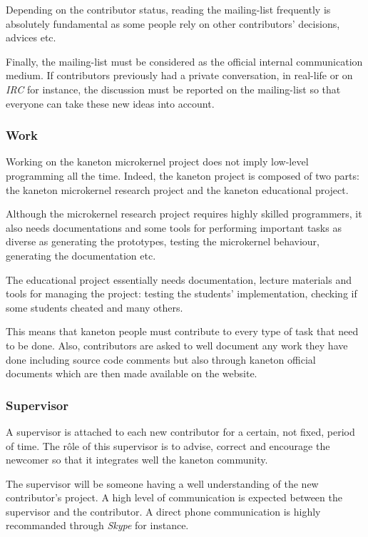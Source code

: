 Depending on the contributor status, reading the mailing-list frequently is
absolutely fundamental as some people rely on other contributors' decisions,
advices etc.

Finally, the mailing-list must be considered as the official internal
communication medium. If contributors previously had a private conversation,
in real-life or on \textit{IRC} for instance, the discussion must be reported
on the mailing-list so that everyone can take these new ideas into account.


\subsubsection{Work}

Working on the kaneton microkernel project does not imply low-level programming
all the time. Indeed, the kaneton project is composed of two parts: the
kaneton microkernel research project and the kaneton educational project.

Although the microkernel research project requires highly skilled programmers,
it also needs documentations and some tools for performing important tasks as
diverse as generating the prototypes, testing the microkernel behaviour,
generating the documentation etc.

The educational project essentially needs documentation, lecture materials
and tools for managing the project: testing the students' implementation,
checking if some students cheated and many others.

This means that kaneton people must contribute to every type of task
that need to be done. Also, contributors are asked to well document
any work they have done including source code comments but also through
kaneton official documents which are then made available on the website.


\subsubsection{Supervisor}

A supervisor is attached to each new contributor for a certain, not fixed,
period of time. The r\^ole of this supervisor is to advise, correct and
encourage the newcomer so that it integrates well the kaneton community.

The supervisor will be someone having a well understanding of the new
contributor's project. A high level of communication is expected between
the supervisor and the contributor. A direct phone communication is highly
recommanded through \textit{Skype} for instance.
